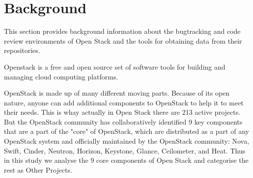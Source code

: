 \documentclass[ifip]{svmult}
\begin{document}
\section{Background}
\label{sec:3}

This section provides background information about the bugtracking and code review environments of Open Stack and the 
tools for obtaining data from their repositories.

Openstack is a free and open source set of software tools for building and managing cloud computing platforms. 



OpenStack is made up of many different moving parts. Because of its open nature, anyone can add additional components to OpenStack 
to help it to meet their needs. This is whay actually in Open Stack there are 213 active projects. 
But the OpenStack community has collaboratively identified 9 key components that are a part of 
the "core" of OpenStack, which are distributed as a part of any OpenStack system and officially maintained by the OpenStack community: 
Nova, Swift, Cinder, Neutron, Horizon, Keystone, Glance, Ceilometer, and Heat.
Thus in this study we analyse the 9 core components of Open Stack and categorise the rest as Other Projects.
\end{document}
